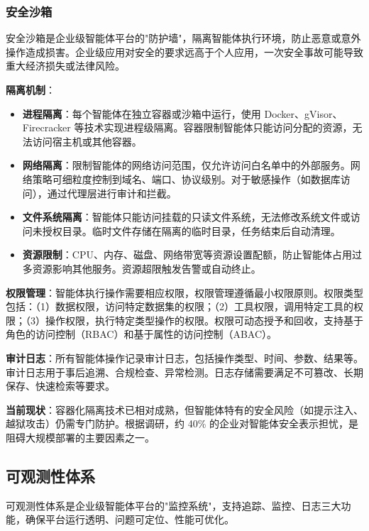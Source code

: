 \documentclass[12pt,a4paper]{article}
\begin{document}
\subsubsection{安全沙箱}

安全沙箱是企业级智能体平台的"防护墙"，隔离智能体执行环境，防止恶意或意外操作造成损害。企业级应用对安全的要求远高于个人应用，一次安全事故可能导致重大经济损失或法律风险。

\textbf{隔离机制}：
\begin{itemize}
    \item \textbf{进程隔离}：每个智能体在独立容器或沙箱中运行，使用 Docker、gVisor、Firecracker 等技术实现进程级隔离。容器限制智能体只能访问分配的资源，无法访问宿主机或其他容器。
    
    \item \textbf{网络隔离}：限制智能体的网络访问范围，仅允许访问白名单中的外部服务。网络策略可细粒度控制到域名、端口、协议级别。对于敏感操作（如数据库访问），通过代理层进行审计和拦截。
    
    \item \textbf{文件系统隔离}：智能体只能访问挂载的只读文件系统，无法修改系统文件或访问未授权目录。临时文件存储在隔离的临时目录，任务结束后自动清理。
    
    \item \textbf{资源限制}：CPU、内存、磁盘、网络带宽等资源设置配额，防止智能体占用过多资源影响其他服务。资源超限触发告警或自动终止。
\end{itemize}

\textbf{权限管理}：智能体执行操作需要相应权限，权限管理遵循最小权限原则。权限类型包括：（1）数据权限，访问特定数据集的权限；（2）工具权限，调用特定工具的权限；（3）操作权限，执行特定类型操作的权限。权限可动态授予和回收，支持基于角色的访问控制（RBAC）和基于属性的访问控制（ABAC）。

\textbf{审计日志}：所有智能体操作记录审计日志，包括操作类型、时间、参数、结果等。审计日志用于事后追溯、合规检查、异常检测。日志存储需要满足不可篡改、长期保存、快速检索等要求。

\textbf{当前现状}：容器化隔离技术已相对成熟，但智能体特有的安全风险（如提示注入、越狱攻击）仍需专门防护。根据调研，约 40\% 的企业对智能体安全表示担忧，是阻碍大规模部署的主要因素之一。

\subsection{可观测性体系}

可观测性体系是企业级智能体平台的"监控系统"，支持追踪、监控、日志三大功能，确保平台运行透明、问题可定位、性能可优化。
\end{document}
